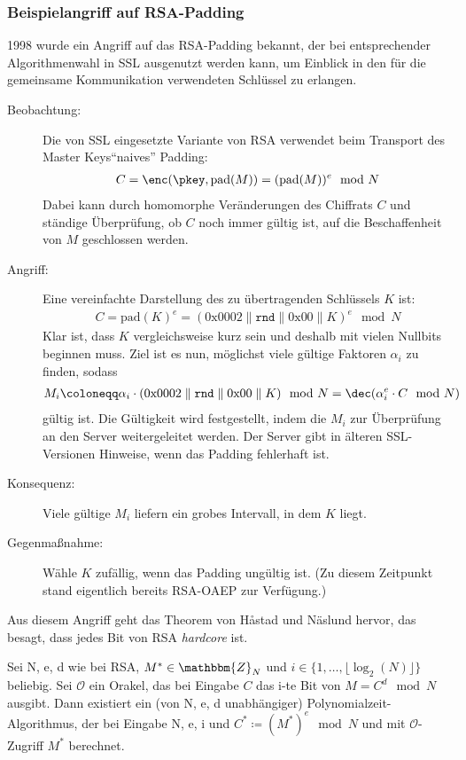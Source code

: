 \subsubsection{Beispielangriff auf RSA-Padding} 1998 wurde ein Angriff
auf das RSA-Padding bekannt, der bei entsprechender Algorithmenwahl in
SSL ausgenutzt werden kann, um Einblick in den für die gemeinsame
Kommunikation verwendeten Schlüssel zu erlangen.
\begin{description}
\item[Beobachtung:] Die von SSL eingesetzte Variante von RSA
  verwendet beim Transport des Master Keys\indexTLSMasterKey "`naives"'
  Padding:
  \begin{align*} C = \enc(\pkey, \text{pad}(M)) =
    (\text{pad}(M))^e \mod N
  \end{align*} Dabei kann durch homomorphe Veränderungen
  des Chiffrats $C$ und ständige Überprüfung, ob $C$ noch immer gültig
  ist, auf die Beschaffenheit von $M$ geschlossen werden.
\item[Angriff:] Eine vereinfachte Darstellung des zu
  übertragenden Schlüssels $K$ ist:
  \begin{align*} C = \text{pad}(K)^e =
    (0\mathrm{x}0002 \parallel \mathtt{rnd} \parallel
    0\mathrm{x}00 \parallel K)^e \mod N
  \end{align*} Klar ist, dass $K$ vergleichsweise kurz
  sein und deshalb mit vielen Nullbits beginnen muss. Ziel ist es nun,
  möglichst viele gültige Faktoren $\alpha_i$ zu finden, sodass
  \begin{align*} M_i \coloneqq \alpha_i \cdot
    (0\mathrm{x}0002 \parallel \mathtt{rnd} \parallel
    0\mathrm{x}00 \parallel K) \mod N = \dec(\alpha_i^e \cdot C \mod N)
  \end{align*} gültig ist. Die Gültigkeit wird
  festgestellt, indem die $M_i$ zur Überprüfung an den Server
  weitergeleitet werden. Der Server gibt in älteren SSL-Versionen
  Hinweise, wenn das Padding fehlerhaft ist.
\item[Konsequenz:] Viele gültige $M_i$ liefern ein grobes
  Intervall, in dem $K$ liegt.
\item[Gegenmaßnahme:] Wähle $K$ zufällig, wenn das Padding
  ungültig ist. (Zu diesem Zeitpunkt stand eigentlich bereits RSA-OAEP zur
  Verfügung.)
\end{description} 
Aus diesem Angriff geht das Theorem von Håstad und Näslund hervor, das
besagt, dass jedes Bit von RSA \emph{hardcore} ist.
\begin{theorem} Sei N, e, d wie bei RSA, $M^* \in
\mathbbm{Z}_N$ und $i \in \{1, \ldots , \lfloor \log_2(N)\rfloor \}$
beliebig. Sei $\mathcal{O}$ ein Orakel, das bei Eingabe $C$ das i-te Bit
von $M = C^d \mod N$ ausgibt. Dann existiert ein (von N, e, d
unabhängiger) Polynomialzeit-Algorithmus, der bei Eingabe N, e, i und
$C^* \coloneqq (M^*)^e \mod N$ und mit $\mathcal{O}$-Zugriff $M^*$ berechnet.
\end{theorem}

